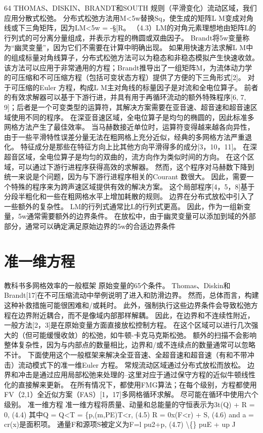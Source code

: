 \documentclass[UTF8,11pt,a4paper,openany,fontset=fandol]{ctexbook}
\begin{document}
64 THOMAS、DISKIN、BRANDT和SOUTH 规则（平滑变化）流动区域，我们应用分散式松弛。 分布式松弛方法用M<5w替换Sq，使生成的矩阵L M变成对角线或下三角矩阵，因为LM<5w = -§[R。 （4.3）LM的对角元素理想地由矩阵L的行列式的可分离分量组成，并表示方程的椭圆或双曲因子。 Brandt将5w变量称为“幽灵变量”，因为它们不需要在计算中明确出现。 如果用快速方法求解L M中的组成标量对角线算子，分布式松弛方法可以为稳态和非稳态模拟产生快速收敛。 该方法可以应用于非常通用的方程；Brandt推导出了一组矩阵M，为流体动力学的可压缩和不可压缩方程（包括可变状态方程）提供了方便的下三角形式[2]。 对于可压缩的Euler 方程，构成L M主对角线的标量因子是对流和全电位算子。 前者的有效求解器可以基于下游行进，并具有用于再循环流动的额外特殊程序[6, 7, 9]；后者是一个可变类型的运算符，其解决方案需要在亚音速、超音速和超音速区域使用不同的程序。 在深亚音速区域，全电位算子是均匀的椭圆的，因此标准多网格方法产生了最佳效率。 当马赫数接近单位时，运算符变得越来越各向异性，由于一些平滑特性误差分量无法在粗网格上充分近似，经典的多网格方法严重退化。 特征成分是那些在特征方向上比其他方向平滑得多的成分[3，10，11]。 在深超音区域，全电位算子是均匀的双曲的，流方向作为类似时间的方向。 在这个区域，可以通过下游行进程序获得高效的求解器。 然而，这个程序对马赫数下降到统一来说是个问题，因为与下游行进程序相关的Courant 数很大。 因此，需要一个特殊的程序来为跨声速区域提供有效的解决方案。 这个局部程序[4，5，8]基于分段半粗化和一些在粗网格水平上增加耗散的规则。 边界在分布式放松中引入了一些额外的复杂性。 LM的行列式通常比L的行列式更高。 因此，作为一组新变量，5w通常需要额外的边界条件。 在放松中，由于幽灵变量可以添加到域的外部部分，通常可以确定满足原始边界的5w的合适边界条件

\section{准一维方程}
教科书多网格效率的一般框架 原始变量的65个条件。 Thomas、Diskin和Brandt[17]在不可压缩流动中举例说明了进入和防滑边界。 然而，总体而言，构建这种补救措施可能很困难和/或耗时。 此外，强制执行这些边界条件会导致松弛方程在边界附近耦合，而不是像域内部那样解耦。 因此，在边界和不连续性附近，一般方法[2，3]是在原始变量方面直接放松控制方程。 在这个区域可以进行几次强大的（但可能缓慢收敛）的松弛，如牛顿-卡克马克斯松弛。 额外的扫描不会影响整体复杂性，因为与内部点的数量相比，边界和/或不连续点的数量通常可以忽略不计。 下面使用这个一般框架来解决全亚音速、全超音速和超音速（有和不带冲击）流动模式下的准一维Euler 方程。 常规流动区域通过分布式放松而放松。 边界和冲击是通过应用局部松弛来处理的--这里对应于通过保守方程的近似牛顿线性化的直接解来更新。 在所有情况下，都使用FMG算法；在每个级别，方程都使用FV（2,1）全近似方案（FAS）[1，17]多网格循环求解。 尽可能在循环中使用六个级别。 准一维方程 准一维方程将质量、动量和总能量的守恒表示为3t(Q) + R = 0, (4.4) 其中Q = Q<T = \{p,(m,PE)T<r, (4.5) R = 0x(F<r) + S, (4.6) and a = cr(x)是面积项。 通量F和源项S被定义为F=l pu2+p, (4.7) \textbackslash\{\} puE + up J
\end{document}
